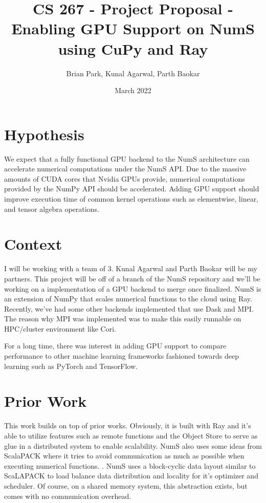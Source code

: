 \documentclass{article}
\title{CS 267 - Project Proposal - Enabling GPU Support on NumS using CuPy and Ray}
\author{Brian Park, Kunal Agarwal, Parth Baokar }
\date{March 2022}
\begin{document}
\maketitle


\section{Hypothesis}
We expect that a fully functional GPU backend to the NumS architecture can accelerate numerical computations under the NumS API. Due to the massive amounts of CUDA cores that Nvidia GPUs provide, numerical computations provided by the NumPy API should be accelerated. Adding GPU support should improve execution time of common kernel operations such as elementwise, linear, and tensor algebra operations. 

\section{Context}
I will be working with a team of 3. Kunal Agarwal and Parth Baokar will be my partners. This project will be off of a branch of the NumS repository and we'll be working on a implementation of a GPU backend to merge once finalized. \cite{NumS} NumS is an extension of NumPy that scales numerical functions to the cloud using Ray. Recently, we've had some other backends implemented that use Dask and MPI. The reason why MPI was implemented was to make this easily runnable on HPC/cluster environment like Cori. 

For a long time, there was interest in adding GPU support to compare performance to other machine learning frameworks fashioned towards deep learning such as PyTorch and TensorFlow.

\section{Prior Work}
This work builds on top of prior works. Obviously, it is built with Ray and it's able to utilize features such as remote functions and the Object Store to serve as glue in a distributed system to enable scalability. \cite{DBLP:journals/corr/abs-1712-05889} NumS also uses some ideas from ScalaPACK where it tries to avoid communication as much as possible when executing numerical functions. \cite{10.5555/265932}.  NumS uses a block-cyclic data layout similar to ScaLAPACK to load balance data distribution and locality for it's optimizer and scheduler. Of course, on a shared memory system, this abstraction exists, but comes with no communication overhead. 
\end{document}
